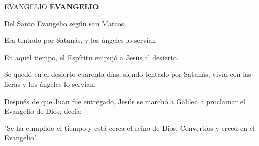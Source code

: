 \begin{redtitle}EVANGELIO \textbf{EVANGELIO}\end{redtitle}




\begin{readbook}Del Santo Evangelio según san Marcos \end{readbook}

\begin{readtheme}Era tentado por Satanás, y los ángeles lo servían\end{readtheme}

\begin{readbody}En aquel tiempo, el Espíritu empujó a Jesús al desierto.\end{readbody}

\begin{readbody}Se quedó en el desierto cuarenta días, siendo tentado por Satanás; vivía con las fieras y los ángeles lo servían.\end{readbody}

\begin{readbody}Después de que Juan fue entregado, Jesús se marchó a Galilea a proclamar el Evangelio de Dios; decía:\end{readbody}

\begin{readtalk} "Se ha cumplido el tiempo y está cerca el reino de Dios. Convertíos y creed en el Evangelio".\end{readtalk}
